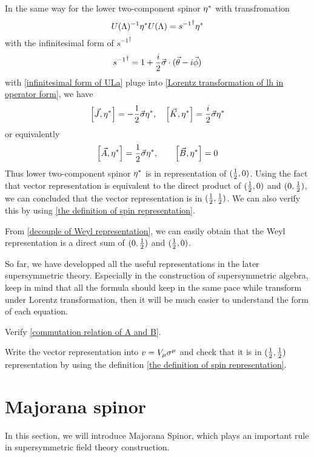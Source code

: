 In the same way for the lower two-component spinor ${\eta^*}$ with transfromation
\begin{equation} \label{Lorentz transformation of lh in operator form}
U(\Lambda)^{-1}{\eta^*} U(\Lambda) = {s^{-1}}^{\dagger} {\eta^*}
\end{equation}
with the infinitesimal form of ${s^{-1}}^{\dagger}$
\begin{equation}
  {s^{-1}}^{\dagger} = 1 + \frac{i}{2}\vec{\sigma}\cdot(\vec{\theta}-i\vec{\phi})
\end{equation}
with \eqref{infinitesimal form of ULa} pluge into \eqref{Lorentz transformation of lh in operator form}, we have
\begin{equation}
  \comm{\vec{J}}{\lh}=-\half\vec{\s}\lh,\quad
\comm{\vec{K}}{\lh} = \frac{i}{2}\vec{\s}\lh
\end{equation}
or equivalently
\begin{equation}
  \comm{\vec{A}}{\lh} = \half \vec{\s}\lh,\qquad
\comm{\vec{B}}{\lh} =0
\end{equation}
Thus lower two-component spinor ${\eta^*}$ is in representation of $(\frac{1}{2},0)$.
Using the fact that vector representation is equivalent to the direct product of $(\frac{1}{2},0)$ and $(0,\frac{1}{2})$, we can concluded that the vector representation is in $(\frac{1}{2},\frac{1}{2})$. We can also verify this by using \eqref{the definition of spin representation}.

From \eqref{decouple of Weyl representation}, we can easily obtain that the Weyl representation is a direct sum of $(0,\frac{1}{2})$ and $(\frac{1}{2},0)$. 

So far, we have developped all the useful representations in the later supersymmetric theory. Especially in the construction of supersymmetric algebra, keep in mind that all the formula should keep in the same pace while transform under Lorentz transformation, then it will be much easier to understand the form of each equation.

\begin{Exe}
Verify \eqref{commutation relation of A and B}.
\end{Exe}

\begin{Exe}
Write the vector representation into $v=V_{\mu} \sigma^{\mu}$ and check that it is in $(\frac{1}{2},\frac{1}{2})$ representation by using the definition \eqref{the definition of spin representation}.
\end{Exe}

\section{Majorana spinor}

In this section, we will introduce Majorana Spinor, which plays an important rule in supersymmetric field theory construction.
